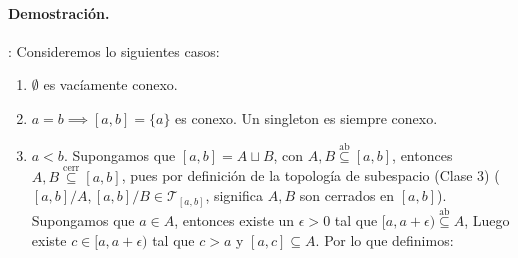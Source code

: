 \paragraph{\textbf{Demostración.}}: Consideremos lo siguientes casos:

\begin{enumerate}[label=(\Roman*)]
  \item $\emptyset$ es vacíamente conexo.
  \item $a=b \implies [a,b] = \{a\}$ es conexo. Un singleton es siempre conexo.
  \item $a<b$. Supongamos que $[a,b] = A \sqcup B$, con $A,B \overset{\text{ab}}\subseteq [a,b]$, entonces $A,B \overset{\text{cerr}}\subseteq [a,b]$, pues por definición de la topología de subespacio (Clase 3) ($[a,b]/A,[a,b]/B \in \mathcal T_{[a,b]}$, significa $A,B$ son cerrados en $[a,b]$). Supongamos que $a\in A$, entonces existe un $\epsilon > 0$ tal que $[a,a+\epsilon) \overset{\text{ab}}\subseteq A$, Luego existe $c \in [a, a+\epsilon)$ tal que $c>a$ y $[a,c] \subseteq A$. Por lo que definimos:
  
  \begin{center}
    \shorthandoff{<>}
    \shorthandon{<>}
  \end{center}
  

\end{enumerate}
